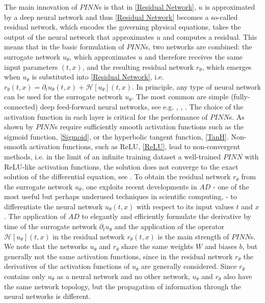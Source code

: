 The main innovation of $PINN$s is that in \cref{Residual Network}, $u$ is approximated by a deep neural network and thus \cref{Residual Network} becomes a so-called residual network, which encodes the governing physical equations, takes the output of the neural network that approximates $u$ and computes a residual. This means that in the basic formulation of $PINN$s, two networks are combined: the surrogate network $u_\theta$, which approximates $u$ and therefore receives the same input parameters $\left(t,x\right)$, and the resulting residual network $r_\theta$, which emerges when $u_\theta$ is substituted into \cref{Residual Network}, i.e. $r_\theta\left(t,x\right) = \partial_t u_\theta \left(t,x\right) + \mathcal{H} \left[ u_\theta \right] \left(t, x\right)$. In principle, any type of neural network can be used for the surrogate network $u_\theta$. The most common are simple (fully-connected) deep feed-forward neural networks, see e.g. \cite{RaissiPerdikarisKarniadakis:2019}, \cite{BlechschmidtErnst:2021}, \cite{Markidis:2021}. The choice of the activation function in each layer is critical for the performance of $PINN$s. As shown by \cite{MishraMolinaro:2021} $PINN$s require sufficiently smooth activation functions such as the sigmoid function, \cref{Sigmoid}, or the hyperbolic tangent function, \cref{TanH}. Non-smooth activation functions, such as ReLU, \cref{ReLU}, lead to non-convergent methods, i.e. in the limit of an infinite training dataset a well-trained $PINN$ with ReLU-like activation functions, the solution does not converge to the exact solution of the differential equation, see \cite{MishraMolinaro:2021}. To obtain the residual network $r_\theta$ from the surrogate network $u_\theta$, one exploits recent developments in $AD$ - one of the most useful but perhaps underused techniques in scientific computing, \cite[p.~3]{RaissiPerdikarisKarniadakisPart1:2017} - to differentiate the neural network $u_\theta\left(t,x\right)$ with respect to its input values $t$ and $x$. The application of $AD$ to elegantly and efficiently formulate the derivative by time of the surrogate network $\partial_t u_\theta$ and the application of the operator $\mathcal{H} \left[ u_\theta \right] \left(t,x\right)$ in the residual network $r_\theta\left(t,x\right)$ is the main strength of $PINN$s. We note that the networks $u_\theta$ and $r_\theta$ share the same weights $W$ and biases $b$, but generally not the same activation functions, since in the residual network $r_\theta$ the derivatives of the activation functions of $u_\theta$ are generally considered. Since $r_\theta$ contains only $u_\theta$ as a neural network and no other network, $u_\theta$ and $r_\theta$ also have the same network topology, but the propagation of information through the neural networks is different. \\

